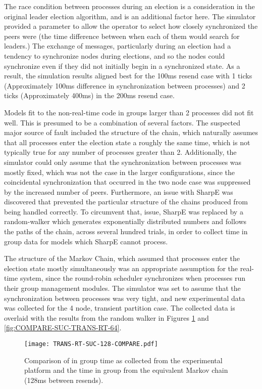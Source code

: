 The race condition between processes during an election is a consideration in the original
leader election algorithm, and is an additional factor here. The simulator provided a parameter
to allow the operator to select how closely synchronized the peers were (the time difference
between when each of them would search for leaders.) The exchange of messages, particularly
during an election had a tendency to synchronize nodes during elections, and so the nodes could
synchronize even if they did not initially begin in a synchronized state. As a result, the
simulation results aligned best for the 100ms resend case with 1 ticks (Approximately 100ms
difference in synchronization between processes) and 2 ticks (Approximately 400ms) in the 200ms
resend case.

Models fit to the non-real-time code in groups larger than 2 processes did not fit well.
This is presumed to be a combination of several factors. The suspected major source of fault
included the structure of the chain, which naturally assumes that all processes enter the
election state a roughly the same time, which is not typically true for any number of processes
greater than 2. Additionally, the simulator could only assume that the synchronization between
processes was mostly fixed, which was not the case in the larger configurations, since the
coincidental synchronization that occurred in the two node case was suppressed by the increased
number of peers. Furthermore, an issue with SharpE was discovered that prevented the
particular structure of the chains produced from being handled correctly. To circumvent that,
issue, SharpE was replaced by a random-walker which generates exponentially distributed numbers
and follows the paths of the chain, across several hundred trials, in order to collect time in group data for
models which SharpE cannot process.

The structure of the Markov Chain, which assumed that processes enter the election state
mostly simultaneously was an appropriate assumption for the real-time system, since the
round-robin scheduler synchronizes when processes run their group management modules. The
simulator was set to assume that the synchronization between processes was very tight, and
new experimental data was collected for the 4 node, transient partition case. The collected
data is overlaid with the results from the random walker in Figures \ref{fig:COMPARE-SUC-TRANS-RT-128} and \ref{fig:COMPARE-SUC-TRANS-RT-64}.

\begin{figure}[!h]
\centering
\texttt{[image: TRANS-RT-SUC-128-COMPARE.pdf]}

\caption{Comparison of in group time as collected from the experimental platform and the time in group from the equivalent Markov chain (128ms between resends).}
\label{fig:COMPARE-SUC-TRANS-RT-128}
\end{figure}

